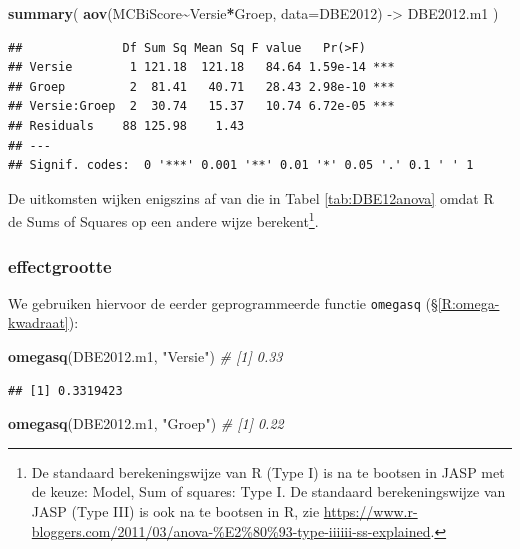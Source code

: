 \documentclass[
]{book}
\newenvironment{Shaded}{\begin{snugshade}}{\end{snugshade}}
\newcommand{\AttributeTok}[1]{\textcolor[rgb]{0.13,0.29,0.53}{#1}}
\newcommand{\CommentTok}[1]{\textcolor[rgb]{0.56,0.35,0.01}{\textit{#1}}}
\newcommand{\FunctionTok}[1]{\textcolor[rgb]{0.13,0.29,0.53}{\textbf{#1}}}
\newcommand{\NormalTok}[1]{#1}
\newcommand{\OtherTok}[1]{\textcolor[rgb]{0.56,0.35,0.01}{#1}}
\newcommand{\SpecialCharTok}[1]{\textcolor[rgb]{0.81,0.36,0.00}{\textbf{#1}}}
\newcommand{\StringTok}[1]{\textcolor[rgb]{0.31,0.60,0.02}{#1}}
\begin{document}
\begin{Shaded}
\begin{Highlighting}[]
\FunctionTok{summary}\NormalTok{( }\FunctionTok{aov}\NormalTok{(MCBiScore}\SpecialCharTok{\textasciitilde{}}\NormalTok{Versie}\SpecialCharTok{*}\NormalTok{Groep, }\AttributeTok{data=}\NormalTok{DBE2012) }\OtherTok{{-}\textgreater{}}\NormalTok{ DBE2012.m1 )}
\end{Highlighting}
\end{Shaded}

\begin{verbatim}
##              Df Sum Sq Mean Sq F value   Pr(>F)    
## Versie        1 121.18  121.18   84.64 1.59e-14 ***
## Groep         2  81.41   40.71   28.43 2.98e-10 ***
## Versie:Groep  2  30.74   15.37   10.74 6.72e-05 ***
## Residuals    88 125.98    1.43                     
## ---
## Signif. codes:  0 '***' 0.001 '**' 0.01 '*' 0.05 '.' 0.1 ' ' 1
\end{verbatim}

De uitkomsten wijken enigszins af van die in Tabel \ref{tab:DBE12anova} omdat R de Sums of Squares op een andere wijze berekent\footnote{De standaard berekeningswijze van R (Type I) is na te bootsen in JASP met de keuze: Model, Sum of squares: Type I. De standaard berekeningswijze van JASP (Type III) is ook na te bootsen in R, zie \url{https://www.r-bloggers.com/2011/03/anova-\%E2\%80\%93-type-iiiiii-ss-explained}.}.

\subsubsection{effectgrootte}\label{effectgrootte}

We gebruiken hiervoor de eerder geprogrammeerde functie \texttt{omegasq} (§\ref{R:omega-kwadraat}):

\begin{Shaded}
\begin{Highlighting}[]
\FunctionTok{omegasq}\NormalTok{(DBE2012.m1, }\StringTok{"Versie"}\NormalTok{)        }\CommentTok{\# [1] 0.33}
\end{Highlighting}
\end{Shaded}

\begin{verbatim}
## [1] 0.3319423
\end{verbatim}

\begin{Shaded}
\begin{Highlighting}[]
\FunctionTok{omegasq}\NormalTok{(DBE2012.m1, }\StringTok{"Groep"}\NormalTok{)         }\CommentTok{\# [1] 0.22}
\end{Highlighting}
\end{Shaded}
\end{document}
